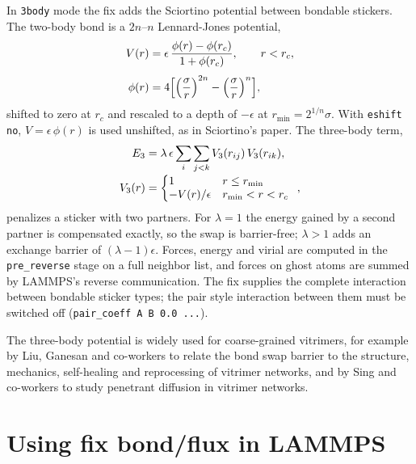 \documentclass[a4paper]{tufte-handout}
\newcommand{\cmd}[1]{\texttt{#1}}
\begin{document}
In \cmd{3body} mode the fix adds the Sciortino potential between bondable stickers. The two-body
bond is a $2n$--$n$ Lennard-Jones potential,
\begin{equation}
\begin{array}{r@{\;}l}
V(r) = & \displaystyle\epsilon\,\frac{\phi(r) - \phi(r_c)}{1 + \phi(r_c)}, \qquad r < r_c,\\[3ex]
\phi(r) = & \displaystyle 4\Bigl[\Bigl(\frac{\sigma}{r}\Bigr)^{2n} - \Bigl(\frac{\sigma}{r}\Bigr)^{n}\Bigr],
\end{array}
\end{equation}
shifted to zero at $r_c$ and rescaled to a depth of $-\epsilon$ at $r_\text{min} = 2^{1/n}\sigma$.
With \cmd{eshift no}, $V = \epsilon\,\phi(r)$ is used unshifted, as in Sciortino's paper. The
three-body term,
\begin{equation}
\begin{array}{r@{\;}l}
E_3 = & \displaystyle\lambda\,\epsilon \sum_i \sum_{j<k} V_3(r_{ij})\,V_3(r_{ik}),\\[3ex]
V_3(r) = & \left\{\begin{array}{@{}ll} 1 & r \le r_\text{min}\\ -V(r)/\epsilon & r_\text{min} < r < r_c\end{array}\right.,
\end{array}
\end{equation}
penalizes a sticker with two partners. For $\lambda = 1$ the energy gained by a second partner is
compensated exactly, so the swap is barrier-free; $\lambda > 1$ adds an exchange barrier of
$(\lambda - 1)\epsilon$. Forces, energy and virial are computed in the \cmd{pre\_reverse} stage on a
full neighbor list, and forces on ghost atoms are summed by LAMMPS's reverse communication. The fix
supplies the complete interaction between bondable sticker types; the pair style interaction
between them must be switched off (\cmd{pair\_coeff A B 0.0 ...}).

The three-body potential is widely used for coarse-grained vitrimers, for example by Liu,
Ganesan and co-workers to relate the bond swap barrier to the structure, mechanics, self-healing
and reprocessing of vitrimer networks,\cite{Zhao2022} and by Sing and co-workers to study
penetrant diffusion in vitrimer networks.\cite{Lin2026}

\section{Using fix bond/flux in LAMMPS}
\end{document}
